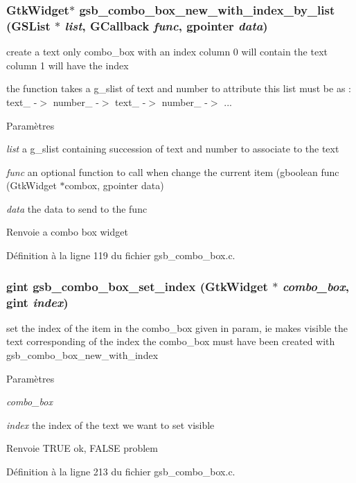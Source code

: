 \subsubsection[{gsb\_\-combo\_\-box\_\-new\_\-with\_\-index\_\-by\_\-list}]{\setlength{\rightskip}{0pt plus 5cm}GtkWidget$\ast$ gsb\_\-combo\_\-box\_\-new\_\-with\_\-index\_\-by\_\-list (GSList $\ast$ {\em list}, \/  GCallback {\em func}, \/  gpointer {\em data})}\label{gsb__combo__box_8c_aaa528158307654e8a321fbaaf07cd349}
create a text only combo\_\-box with an index column 0 will contain the text column 1 will have the index

the function takes a g\_\-slist of text and number to attribute this list must be as : text\_ -\/$>$ number\_ -\/$>$ text\_ -\/$>$ number\_ -\/$>$ ...


\begin{DoxyParams}{Paramètres}
\item[{\em list}]a g\_\-slist containing succession of text and number to associate to the text \item[{\em func}]an optional function to call when change the current item (gboolean func (GtkWidget $\ast$combox, gpointer data) \item[{\em data}]the data to send to the func\end{DoxyParams}
\begin{DoxyReturn}{Renvoie}
a combo box widget 
\end{DoxyReturn}


Définition à la ligne 119 du fichier gsb\_\-combo\_\-box.c.

\subsubsection[{gsb\_\-combo\_\-box\_\-set\_\-index}]{\setlength{\rightskip}{0pt plus 5cm}gint gsb\_\-combo\_\-box\_\-set\_\-index (GtkWidget $\ast$ {\em combo\_\-box}, \/  gint {\em index})}\label{gsb__combo__box_8c_a8d9cde44f97483d1e2ebe3c6c65f5570}
set the index of the item in the combo\_\-box given in param, ie makes visible the text corresponding of the index the combo\_\-box must have been created with gsb\_\-combo\_\-box\_\-new\_\-with\_\-index


\begin{DoxyParams}{Paramètres}
\item[{\em combo\_\-box}]\item[{\em index}]the index of the text we want to set visible\end{DoxyParams}
\begin{DoxyReturn}{Renvoie}
TRUE ok, FALSE problem 
\end{DoxyReturn}


Définition à la ligne 213 du fichier gsb\_\-combo\_\-box.c.

